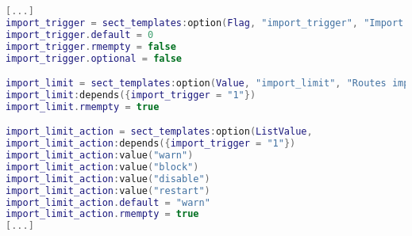\begin{lstlisting}[language=lua, caption={LUCI tied options implementation.}]
[...]
import_trigger = sect_templates:option(Flag, "import_trigger", "Import       Limit", "Enable Routes Import limit settings")
import_trigger.default = 0
import_trigger.rmempty = false
import_trigger.optional = false

import_limit = sect_templates:option(Value, "import_limit", "Routes import   limit", "Specify an import route limit.")
import_limit:depends({import_trigger = "1"})
import_limit.rmempty = true

import_limit_action = sect_templates:option(ListValue,                       "import_limit_action", "Routes import limit action", "Action to take when    import routes limit ir reached")
import_limit_action:depends({import_trigger = "1"})
import_limit_action:value("warn")
import_limit_action:value("block")
import_limit_action:value("disable")
import_limit_action:value("restart")
import_limit_action.default = "warn"
import_limit_action.rmempty = true
[...]
\end{lstlisting}